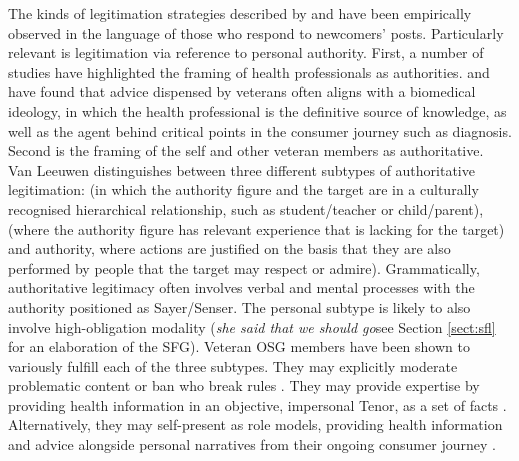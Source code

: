 The kinds of legitimation strategies described by \textcite{van_leeuwen_legitimation_2007} and \textcite{reyes_strategies_2011} have been empirically observed in the language of those who respond to newcomers' \glspl{post}. Particularly relevant is legitimation via reference to personal authority. First, a number of studies have highlighted the framing of health professionals as authorities. \textcite{smithson_problem_2011} and \textcite{vayreda_social_2009} have found that advice dispensed by veterans often aligns with a biomedical ideology, in which the health professional is the definitive source of knowledge, as well as the agent behind critical points in the consumer journey such as diagnosis. Second is the framing of the self and other veteran \glspl{member} as authoritative. Van Leeuwen distinguishes between three different subtypes of authoritative legitimation:  (in which the authority figure and the target are in a culturally recognised hierarchical relationship, such as student\slash teacher or child\slash parent),  (where the authority figure has relevant experience that is lacking for the target) and  authority, where actions are justified on the basis that they are also performed by people that the target may respect or admire). Grammatically, authoritative legitimacy often involves verbal and mental processes with the authority positioned as Sayer\slash Senser. The personal subtype is likely to also involve high\hyp{}obligation modality (\emph{she said that we should go}\textemdash{}see Section \ref{sect:sfl} for an elaboration of the \gls{SFG}). Veteran \gls{OSG} \glspl{member} have been shown to variously fulfill each of the three subtypes. They may explicitly moderate problematic content or ban  who break rules \cite{weber_missed_2011}. They may provide expertise by providing health information in an objective, impersonal Tenor, as a set of facts \cite{kaufman2016producing}. Alternatively, they may self\hyp{}present as role models, providing health information and advice alongside personal narratives from their ongoing consumer journey \cite{koteyko2015performing}.


